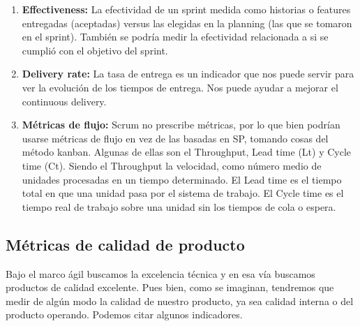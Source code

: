 \begin{enumerate}
\item {\textbf{Effectiveness:} La efectividad de un sprint medida como historias o features entregadas (aceptadas) versus las elegidas en la planning (las que se tomaron en el sprint). También se podría medir la efectividad relacionada a si se cumplió con el objetivo del sprint.
}


\item {\textbf{Delivery rate:} La tasa de entrega es un indicador que nos puede servir para ver la evolución de los tiempos de entrega. Nos puede ayudar a mejorar el continuous delivery.
}

\item {\textbf{Métricas de flujo:} Scrum no prescribe métricas, por lo que bien podrían usarse métricas de flujo en vez de las basadas en SP, tomando cosas del método kanban. Algunas de ellas son el Throughput, Lead time (Lt) y Cycle time (Ct). Siendo el Throughput la velocidad, como número medio de unidades procesadas en un tiempo determinado. El Lead time es el tiempo total en que una unidad pasa por el sistema de trabajo. El Cycle time es el tiempo real de trabajo sobre una unidad sin los tiempos de cola o espera.
}

\end{enumerate}

\subsection{Métricas de calidad de producto}

Bajo el marco ágil buscamos la excelencia técnica y en esa vía buscamos productos de calidad excelente. Pues bien, como se imaginan, tendremos que medir de algún modo la calidad de nuestro producto, ya sea calidad interna o del producto operando. Podemos citar algunos indicadores.

